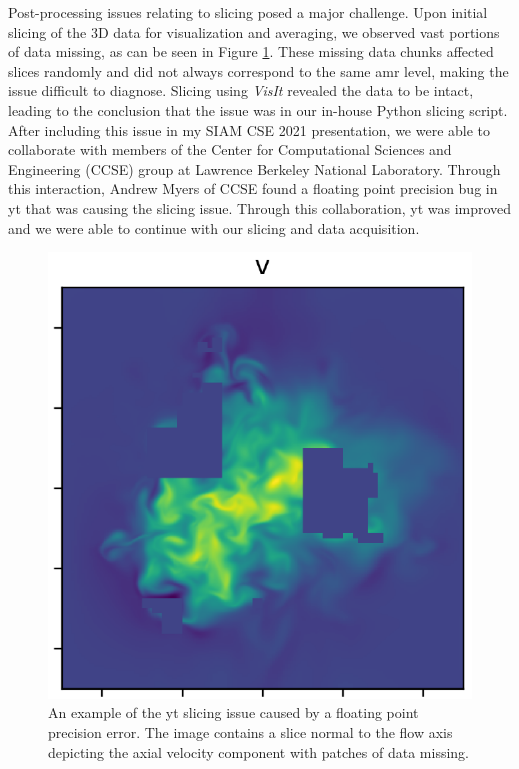 Post-processing issues relating to slicing posed a major challenge. Upon initial slicing of the 3D data for visualization and averaging, we observed vast portions of data missing, as can be seen in Figure \ref{yt_issue}. These missing data chunks affected slices randomly and did not always correspond to the same \gls{amr} level, making the issue difficult to diagnose. Slicing using \textit{VisIt} revealed the data to be intact, leading to the conclusion that the issue was in our in-house Python slicing script. After including this issue in my SIAM CSE 2021 presentation, we were able to collaborate with members of the Center for Computational Sciences and Engineering (CCSE) group at Lawrence Berkeley National Laboratory. Through this interaction, Andrew Myers of CCSE found a floating point precision bug in yt that was causing the slicing issue. Through this collaboration, yt was improved and we were able to continue with our slicing and data acquisition. 

\begin{figure}[H]
\begin{center}
\includegraphics[scale=0.75]{figures/yt_issue.pdf}
\end{center}
\caption{An example of the yt slicing issue caused by a floating point precision error. The image contains a slice normal to the flow axis depicting the axial velocity component with patches of data missing.}
\label{yt_issue}
\end{figure}

